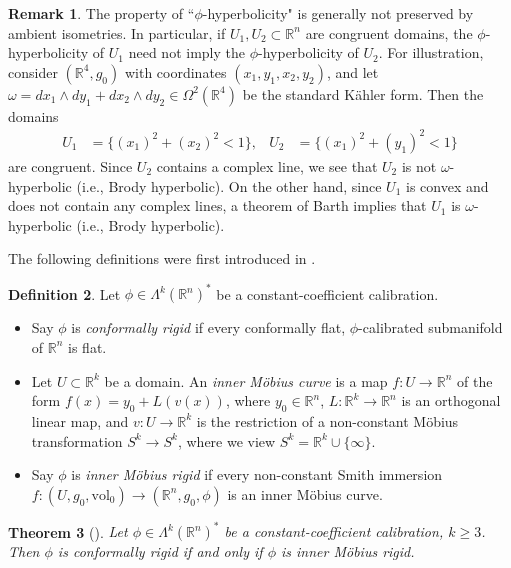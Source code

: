 \documentclass[11pt]{article}
\newcommand{\R}{\mathbb{R}}
\newcommand{\vol}{\mathrm{vol}}
\newtheorem{thm}{Theorem}[section]
\theoremstyle{definition}
\newtheorem{defn}[thm]{Definition}
\newtheorem{rmk}[thm]{Remark}
\numberwithin{equation}{section}
\begin{document}
\begin{rmk} The property of ``$\phi$-hyperbolicity" is generally not preserved by ambient isometries.  In particular, if $U_1, U_2 \subset \R^n$ are congruent domains, the $\phi$-hyperbolicity of $U_1$ need not imply the $\phi$-hyperbolicity of $U_2$.   For illustration, consider $(\R^4, g_0)$ with coordinates $(x_1, y_1, x_2, y_2)$, and let $\omega = dx_1 \wedge dy_1 + dx_2 \wedge dy_2 \in \Omega^2(\R^4)$ be the standard K\"{a}hler form.  Then the domains
\begin{align*}
U_1 & = \{ (x_1)^2 + (x_2)^2 < 1 \}, & U_2 & = \{ (x_1)^2 + (y_1)^2 < 1 \}
\end{align*}
are congruent.  Since $U_2$ contains a complex line, we see that $U_2$ is not $\omega$-hyperbolic (i.e., Brody hyperbolic).  On the other hand, since $U_1$ is convex and does not contain any complex lines, a theorem of Barth \cite{MR572300} implies that $U_1$ is $\omega$-hyperbolic (i.e., Brody hyperbolic).
\end{rmk}

\indent The following definitions were first introduced in \cite{ikonen2024liouville}.

\begin{defn} Let $\phi \in \Lambda^k(\R^n)^*$ be a constant-coefficient calibration.
\begin{itemize}
\item Say $\phi$ is \emph{conformally rigid} if every conformally flat, $\phi$-calibrated submanifold of $\R^n$ is flat.
\item Let $U \subset \R^k$ be a domain.  An \emph{inner M\"{o}bius curve} is a map $f \colon U \to \R^n$ of the form $f(x) = y_0 + L(v(x))$, where $y_0 \in \R^n$, $L \colon \R^k \to \R^n$ is an orthogonal linear map, and $v \colon U \to \R^k$ is the restriction of a non-constant M\"{o}bius transformation $S^k \to S^k$, where we view $S^k = \R^k \cup \{\infty\}$.
\item Say $\phi$ is \emph{inner M\"{o}bius rigid} if every non-constant Smith immersion $f \colon (U, g_0, \vol_0) \to (\R^n, g_0, \phi)$ is an inner M\"{o}bius curve.
\end{itemize}
\end{defn}

\begin{thm}[\cite{ikonen2024liouville}] Let $\phi \in \Lambda^k(\R^n)^*$ be a constant-coefficient calibration, $k \geq 3$.  Then $\phi$ is conformally rigid if and only if $\phi$ is inner M\"{o}bius rigid.
\end{thm}
\end{document}
